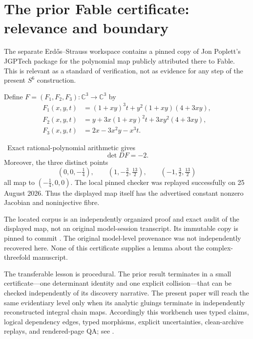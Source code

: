 \section{The prior Fable certificate: relevance and boundary}

The separate Erd\H{o}s--Strauss workspace contains a pinned copy of Jon
Poplett's JGPTech package for the polynomial map publicly attributed there to
Fable.  This is relevant as a standard of verification, not as evidence for
any step of the present $S^6$ construction.

Define $F=(F_1,F_2,F_3)\colon\mathbb C^3\to\mathbb C^3$ by
\begin{align*}
F_1(x,y,t)&=(1+xy)^3t+y^2(1+xy)(4+3xy),\\
F_2(x,y,t)&=y+3x(1+xy)^2t+3xy^2(4+3xy),\\
F_3(x,y,t)&=2x-3x^2y-x^3t.
\end{align*}

\begin{proposition}
\Verified\ Exact rational-polynomial arithmetic gives
\[
\det DF=-2.
\]
Moreover, the three distinct points
\[
\left(0,0,-\tfrac14\right),\qquad
\left(1,-\tfrac32,\tfrac{13}{2}\right),\qquad
\left(-1,\tfrac32,\tfrac{13}{2}\right)
\]
all map to $(-\tfrac14,0,0)$.  The local pinned checker
 was replayed successfully on 25 August 2026.
Thus the displayed map itself has the advertised constant nonzero Jacobian
and noninjective fibre.
\end{proposition}

\begin{remark}
The located corpus is an independently organized proof and exact audit of the
displayed map, not an original model-session transcript.  Its immutable copy
is pinned to commit
.  The original model-level
provenance was not independently recovered here.  None of this certificate
supplies a lemma about the complex-threefold manuscript.
\end{remark}

The transferable lesson is procedural.  The prior result terminates in a
small certificate---one determinant identity and one explicit collision---that
can be checked independently of its discovery narrative.  The present paper
will reach the same evidentiary level only when its analytic gluings terminate
in independently reconstructed integral chain maps.  Accordingly this
workbench uses typed claims, logical dependency edges, typed morphisms,
explicit uncertainties, clean-archive replays, and rendered-page QA; see
.


